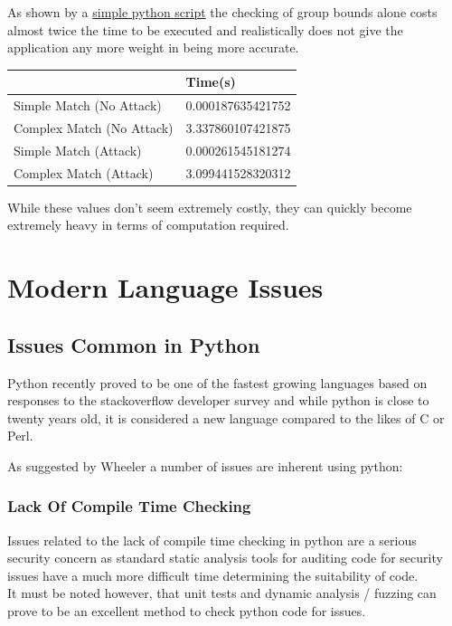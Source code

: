 \documentclass{IEEEtran}
\begin{document}
                As shown by a \hyperref[sec:PyReDoS]{\color{blue}simple python script} the checking of 
                group bounds alone costs almost twice the time to be executed and realistically 
                does not give the application any more weight in being more accurate.
                \begin{table}[H]
                    \centering
                    \begin{tabular}{|l|l|}
                    \hline
                                              & Time(s)                \\ \hline
                    Simple Match (No Attack)  & 0.000187635421752  \\ \hline
                    Complex Match (No Attack) & 3.337860107421875  \\ \hline
                    Simple Match (Attack)     & 0.000261545181274 \\ \hline
                    Complex Match (Attack)    & 3.099441528320312 \\ \hline
                    \end{tabular}
                    \end{table}

                While these values don't seem extremely costly, they can quickly become extremely heavy in
                terms of computation required.

    \newpage
    \twocolumn
    \section{Modern Language Issues}
        \subsection{Issues Common in Python}
            Python recently proved to be one of the fastest growing languages based on responses to 
            the stackoverflow developer survey\cite{Stackoverflow-Survey} and while python is close to 
            twenty years old, it is considered a new language compared to the likes of C or Perl.

            As suggested by Wheeler\cite{Wheeler} a number of issues are inherent using python:
            \subsubsection{Lack Of Compile Time Checking}
                Issues related to the lack of compile time checking in python are a serious security
                concern as standard static analysis tools for auditing code for security issues 
                have a much more difficult time determining the suitability of code.
                \\
                It must be noted however, that unit tests and dynamic analysis / fuzzing can prove
                to be an excellent method to check python code for issues.
\end{document}
